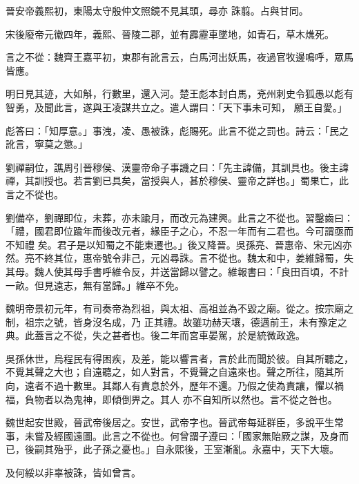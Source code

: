 \begin{pinyinscope}
 晉安帝義熙初，東陽太守殷仲文照鏡不見其頭，尋亦
 誅翦。占與甘同。



 宋後廢帝元徽四年，義熙、晉陵二郡，並有霹靂車墜地，如青石，草木燋死。



 言之不從：魏齊王嘉平初，東郡有訛言云，白馬河出妖馬，夜過官牧邊鳴呼，眾馬皆應。



 明日見其迹，大如斛，行數里，還入河。楚王彪本封白馬，兗州刺史令狐愚以彪有智勇，及聞此言，遂與王凌謀共立之。遣人謂曰：「天下事未可知，
 願王自愛。」



 彪答曰：「知厚意。」事洩，凌、愚被誅，彪賜死。此言不從之罰也。詩云：「民之訛言，寧莫之懲。」



 劉禪嗣位，譙周引晉穆侯、漢靈帝命子事譏之曰：「先主諱備，其訓具也。後主諱禪，其訓授也。若言劉已具矣，當授與人，甚於穆侯、靈帝之詳也。」蜀果亡，此言之不從也。



 劉備卒，劉禪即位，未葬，亦未踰月，而改元為建興。此言之不從也。習鑿齒曰：「禮，國君即位踰年而後改元者，緣臣子之心，不忍一年而有二君也。今可謂亟而不知禮
 矣。君子是以知蜀之不能東遷也。」後又降晉。吳孫亮、晉惠帝、宋元凶亦然。亮不終其位，惠帝號令非己，元凶尋誅。言不從也。魏太和中，姜維歸蜀，失其母。魏人使其母手書呼維令反，并送當歸以譬之。維報書曰：「良田百頃，不計一畝。但見遠志，無有當歸。」維卒不免。



 魏明帝景初元年，有司奏帝為烈祖，與太祖、高祖並為不毀之廟。從之。按宗廟之制，祖宗之號，皆身沒名成，乃
 正其禮。故雖功赫天壤，德邁前王，未有豫定之典。此蓋言之不從，失之甚者也。後二年而宮車晏駕，於是統微政逸。



 吳孫休世，烏程民有得困疾，及差，能以響言者，言於此而聞於彼。自其所聽之，不覺其聲之大也；自遠聽之，如人對言，不覺聲之自遠來也。聲之所往，隨其所向，遠者不過十數里。其鄰人有責息於外，歷年不還。乃假之使為責讓，懼以禍福，負物者以為鬼神，即傾倒畀之。其人
 亦不自知所以然也。言不從之咎也。



 魏世起安世殿，晉武帝後居之。安世，武帝字也。晉武帝每延群臣，多說平生常事，未嘗及經國遠圖。此言之不從也。何曾謂子遵曰：「國家無貽厥之謀，及身而已，後嗣其殆乎，此子孫之憂也。」自永熙後，王室漸亂。永嘉中，天下大壞。



 及何綏以非辜被誅，皆如曾言。




\end{pinyinscope}
